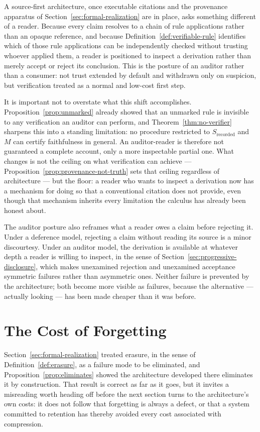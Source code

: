 \documentclass[11pt]{article}
\theoremstyle{definition}
\begin{document}
A source-first architecture, once executable citations and the provenance apparatus of Section~\ref{sec:formal-realization} are in place, asks something different of a reader. Because every claim resolves to a chain of rule applications rather than an opaque reference, and because Definition~\ref{def:verifiable-rule} identifies which of those rule applications can be independently checked without trusting whoever applied them, a reader is positioned to inspect a derivation rather than merely accept or reject its conclusion. This is the posture of an auditor rather than a consumer: not trust extended by default and withdrawn only on suspicion, but verification treated as a normal and low-cost first step.

It is important not to overstate what this shift accomplishes. Proposition~\ref{prop:unmarked} already showed that an unmarked rule is invisible to any verification an auditor can perform, and Theorem~\ref{thm:no-verifier} sharpens this into a standing limitation: no procedure restricted to $S_{\mathrm{recorded}}$ and $M$ can certify faithfulness in general. An auditor-reader is therefore not guaranteed a complete account, only a more inspectable partial one. What changes is not the ceiling on what verification can achieve --- Proposition~\ref{prop:provenance-not-truth} sets that ceiling regardless of architecture --- but the floor: a reader who wants to inspect a derivation now has a mechanism for doing so that a conventional citation does not provide, even though that mechanism inherits every limitation the calculus has already been honest about.

The auditor posture also reframes what a reader owes a claim before rejecting it. Under a deference model, rejecting a claim without reading its source is a minor discourtesy. Under an auditor model, the derivation is available at whatever depth a reader is willing to inspect, in the sense of Section~\ref{sec:progressive-disclosure}, which makes unexamined rejection and unexamined acceptance symmetric failures rather than asymmetric ones. Neither failure is prevented by the architecture; both become more visible as failures, because the alternative --- actually looking --- has been made cheaper than it was before.

\section{The Cost of Forgetting}
\label{sec:cost-forgetting}

Section~\ref{sec:formal-realization} treated erasure, in the sense of Definition~\ref{def:erasure}, as a failure mode to be eliminated, and Proposition~\ref{prop:eliminates} showed the architecture developed there eliminates it by construction. That result is correct as far as it goes, but it invites a misreading worth heading off before the next section turns to the architecture's own costs: it does not follow that forgetting is always a defect, or that a system committed to retention has thereby avoided every cost associated with compression.
\end{document}

